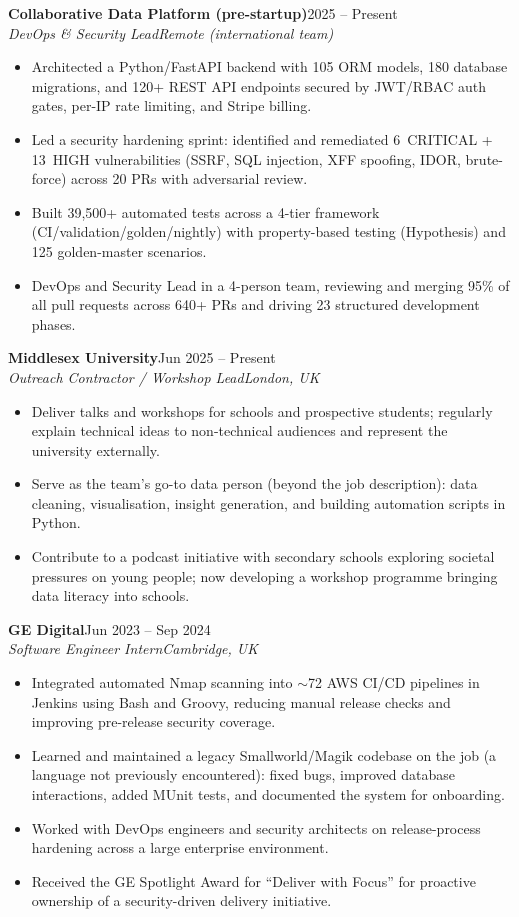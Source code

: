 \documentclass[11pt,a4paper]{article}
\newcommand{\entry}[4]{%
  \textbf{#1}\hfill#2\\
  \textit{#3}\hfill\textit{#4}\par\vspace{1pt}%
}
\begin{document}
\entry{Collaborative Data Platform (pre-startup)}{2025 -- Present}
      {DevOps \& Security Lead}{Remote (international team)}
\begin{itemize}
  \item Architected a Python/FastAPI backend with 105 ORM models, 180
        database migrations, and 120+ REST API endpoints secured by
        JWT/RBAC auth gates, per-IP rate limiting, and Stripe billing.
  \item Led a security hardening sprint: identified and remediated
        6~CRITICAL + 13~HIGH vulnerabilities (SSRF, SQL injection, XFF
        spoofing, IDOR, brute-force) across 20 PRs with adversarial
        review.
  \item Built 39{,}500+ automated tests across a 4-tier framework
        (CI/validation/golden/nightly) with property-based testing
        (Hypothesis) and 125 golden-master scenarios.
  \item DevOps and Security Lead in a 4-person team, reviewing and
        merging 95\% of all pull requests across 640+ PRs and driving
        23 structured development phases.
\end{itemize}

\entry{Middlesex University}{Jun 2025 -- Present}
      {Outreach Contractor / Workshop Lead}{London, UK}
\begin{itemize}
  \item Deliver talks and workshops for schools and prospective students;
        regularly explain technical ideas to non-technical audiences and
        represent the university externally.
  \item Serve as the team's go-to data person (beyond the job
        description): data cleaning, visualisation, insight generation,
        and building automation scripts in Python.
  \item Contribute to a podcast initiative with secondary schools
        exploring societal pressures on young people; now developing a
        workshop programme bringing data literacy into schools.
\end{itemize}

\entry{GE Digital}{Jun 2023 -- Sep 2024}
      {Software Engineer Intern}{Cambridge, UK}
\begin{itemize}
  \item Integrated automated Nmap scanning into $\sim$72 AWS CI/CD
        pipelines in Jenkins using Bash and Groovy, reducing manual
        release checks and improving pre-release security coverage.
  \item Learned and maintained a legacy Smallworld/Magik codebase on the
        job (a language not previously encountered): fixed bugs, improved
        database interactions, added MUnit tests, and documented the
        system for onboarding.
  \item Worked with DevOps engineers and security architects on
        release-process hardening across a large enterprise environment.
  \item Received the GE Spotlight Award for ``Deliver with Focus'' for
        proactive ownership of a security-driven delivery initiative.
\end{itemize}
\end{document}
